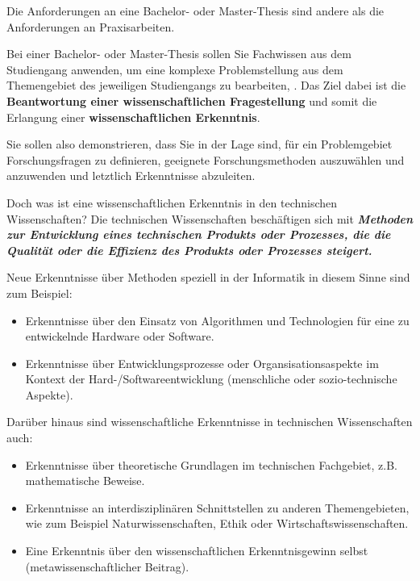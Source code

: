 Die Anforderungen an eine Bachelor- oder Master-Thesis sind andere als die Anforderungen an Praxisarbeiten.

Bei einer Bachelor- oder Master-Thesis sollen Sie Fachwissen aus dem Studiengang anwenden, um eine komplexe Problemstellung aus dem Themengebiet des jeweiligen Studiengangs zu bearbeiten, \cite{FHDWModulhabdbuchBachelor,FHDWModulhabdbuchMasterInformationEngineering}. 
Das Ziel dabei ist die \textbf{Beantwortung einer wissenschaftlichen Fragestellung} und somit die Erlangung einer \textbf{wissenschaftlichen Erkenntnis}.

Sie sollen also demonstrieren, dass Sie in der Lage sind, für ein Problemgebiet Forschungsfragen zu definieren, geeignete Forschungsmethoden auszuwählen und anzuwenden und letztlich Erkenntnisse abzuleiten.


Doch was ist eine wissenschaftlichen Erkenntnis in den technischen Wissenschaften? Die technischen Wissenschaften beschäftigen sich mit \textbf{\textit{Methoden zur Entwicklung eines technischen Produkts oder Prozesses, die die Qualität oder die Effizienz des Produkts oder Prozesses steigert.} }

Neue Erkenntnisse über Methoden speziell in der Informatik in diesem Sinne sind zum Beispiel:

\begin{itemize}
    \item Erkenntnisse über den Einsatz von Algorithmen und Technologien für eine zu entwickelnde Hardware oder Software.
    \item Erkenntnisse über Entwicklungsprozesse oder Organsisationsaspekte im Kontext der Hard-/Softwareentwicklung (menschliche oder sozio-technische Aspekte).
\end{itemize}


Darüber hinaus sind wissenschaftliche Erkenntnisse in technischen Wissenschaften auch:

\begin{itemize}
    \item Erkenntnisse über theoretische Grundlagen im technischen Fachgebiet, z.B. mathematische Beweise.
    \item Erkenntnisse an interdisziplinären Schnittstellen zu anderen Themengebieten, wie zum Beispiel Naturwissenschaften, Ethik oder Wirtschaftswissenschaften.
    \item Eine Erkenntnis über den wissenschaftlichen Erkenntnisgewinn selbst (metawissenschaftlicher Beitrag).
\end{itemize}



